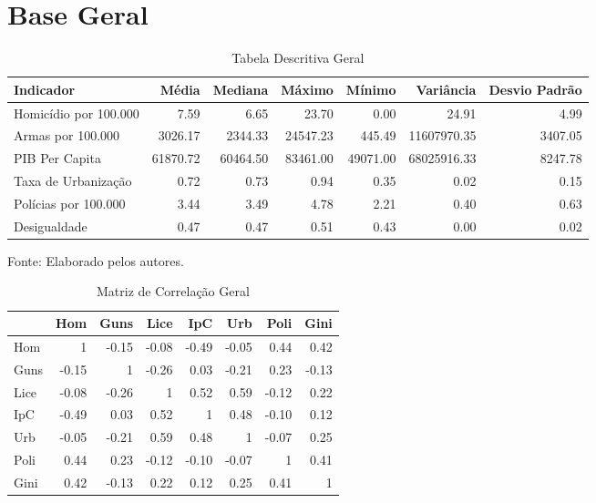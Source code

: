 \documentclass[12pt]{article}
\begin{document}
\section{\textbf{Base Geral}}
\begin{table}[H]
\centering
\caption{Tabela Descritiva Geral}
\label{tab:indicadores_gerais}
\small
\begin{tabularx}{\textwidth}{l*{6}{R}}
\hline
Indicador & Média & Mediana & Máximo & Mínimo & Variância & Desvio Padrão \\ \hline
Homicídio por 100.000 & 7.59 & 6.65 & 23.70 & 0.00 & 24.91 & 4.99 \\
Armas por 100.000 & 3026.17 & 2344.33 & 24547.23 & 445.49 & 11607970.35 & 3407.05 \\
PIB Per Capita & 61870.72 & 60464.50 & 83461.00 & 49071.00 & 68025916.33 & 8247.78 \\
Taxa de Urbanização & 0.72 & 0.73 & 0.94 & 0.35 & 0.02 & 0.15 \\
Polícias por 100.000 & 3.44 & 3.49 & 4.78 & 2.21 & 0.40 & 0.63 \\
Desigualdade & 0.47 & 0.47 & 0.51 & 0.43 & 0.00 & 0.02 \\ \hline
\end{tabularx}
\footnotesize{Fonte: Elaborado pelos autores.}
\end{table}

\begin{table}[H]
\centering
\caption{Matriz de Correlação Geral}
\label{tab:correlation_matrix}
\begin{tabular}{lrrrrrrr}
\hline
      & Hom   & Guns  & Lice  & IpC   & Urb   & Poli  & Gini  \\ \hline
Hom   & 1     & -0.15 & -0.08 & -0.49 & -0.05 & 0.44  & 0.42  \\
Guns  & -0.15 & 1     & -0.26 & 0.03  & -0.21 & 0.23  & -0.13 \\
Lice  & -0.08 & -0.26 & 1     & 0.52  & 0.59  & -0.12 & 0.22  \\
IpC   & -0.49 & 0.03  & 0.52  & 1     & 0.48  & -0.10 & 0.12  \\
Urb   & -0.05 & -0.21 & 0.59  & 0.48  & 1     & -0.07 & 0.25  \\
Poli  & 0.44  & 0.23  & -0.12 & -0.10 & -0.07 & 1     & 0.41  \\
Gini  & 0.42  & -0.13 & 0.22  & 0.12  & 0.25  & 0.41  & 1     \\ \hline
\end{tabular}
\end{table}
\end{document}
